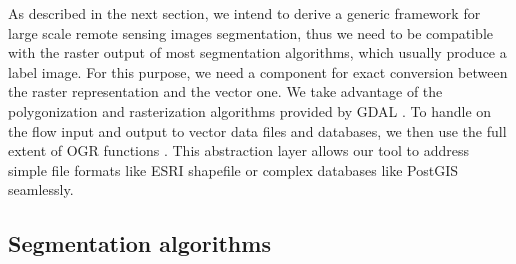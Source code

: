 \documentclass{josis}
\begin{document}
As described in the next section, we intend to derive a generic
framework for large scale remote sensing images segmentation, thus we
need to be compatible with the raster output of most segmentation
algorithms, which usually produce a label image. For this purpose, we
need a component for exact conversion between the raster
representation and the vector one. We take advantage of the
polygonization and rasterization algorithms provided by GDAL
\cite{}. To handle on the flow input and output to vector data files
and databases, we then use the full extent of OGR functions
\cite{}. This abstraction layer allows our tool to address
simple file formats like ESRI shapefile or complex databases like
PostGIS seamlessly.

\subsection{Segmentation algorithms}
\end{document}
